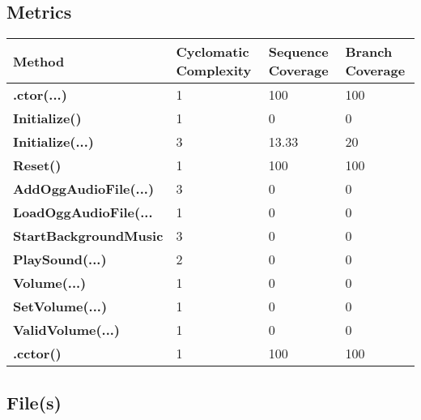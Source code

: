 \documentclass[a4paper,10pt]{article}
\begin{document}
\subsection{Metrics}
\begin{longtable}[l]{|l|l|l|l|}
\hline
\textbf{Method} & \textbf{Cyclomatic Complexity} & \textbf{Sequence Coverage} & \textbf{Branch Coverage}\\
\hline
\textbf{.ctor(...)} & 1 & 100 & 100\\
\hline
\textbf{Initialize()} & 1 & 0 & 0\\
\hline
\textbf{Initialize(...)} & 3 & 13.33 & 20\\
\hline
\textbf{Reset()} & 1 & 100 & 100\\
\hline
\textbf{AddOggAudioFile(...)} & 3 & 0 & 0\\
\hline
\textbf{LoadOggAudioFile(...} & 1 & 0 & 0\\
\hline
\textbf{StartBackgroundMusic} & 3 & 0 & 0\\
\hline
\textbf{PlaySound(...)} & 2 & 0 & 0\\
\hline
\textbf{Volume(...)} & 1 & 0 & 0\\
\hline
\textbf{SetVolume(...)} & 1 & 0 & 0\\
\hline
\textbf{ValidVolume(...)} & 1 & 0 & 0\\
\hline
\textbf{.cctor()} & 1 & 100 & 100\\
\hline
\end{longtable}
\subsection{File(s)}
\end{document}

